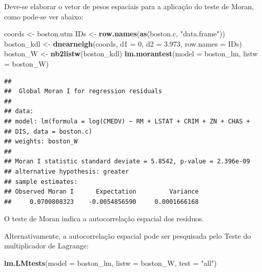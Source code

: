 \documentclass[12pt,]{article}
\newenvironment{Shaded}{\begin{snugshade}}{\end{snugshade}}
\newcommand{\KeywordTok}[1]{\textcolor[rgb]{0.13,0.29,0.53}{\textbf{#1}}}
\newcommand{\DataTypeTok}[1]{\textcolor[rgb]{0.13,0.29,0.53}{#1}}
\newcommand{\DecValTok}[1]{\textcolor[rgb]{0.00,0.00,0.81}{#1}}
\newcommand{\FloatTok}[1]{\textcolor[rgb]{0.00,0.00,0.81}{#1}}
\newcommand{\StringTok}[1]{\textcolor[rgb]{0.31,0.60,0.02}{#1}}
\newcommand{\NormalTok}[1]{#1}
\begin{document}
Deve-se elaborar o vetor de pesos espaciais para a aplicação do teste de
Moran, como pode-se ver abaixo:

\begin{Shaded}
\begin{Highlighting}[]
\NormalTok{coords <-}\StringTok{ }\NormalTok{boston.utm}
\NormalTok{IDs <-}\StringTok{ }\KeywordTok{row.names}\NormalTok{(}\KeywordTok{as}\NormalTok{(boston.c, }\StringTok{"data.frame"}\NormalTok{))}
\NormalTok{boston_kdl <-}\StringTok{ }\KeywordTok{dnearneigh}\NormalTok{(coords, }\DataTypeTok{d1 =} \DecValTok{0}\NormalTok{, }\DataTypeTok{d2 =} \FloatTok{3.973}\NormalTok{, }\DataTypeTok{row.names =}\NormalTok{ IDs)}
\NormalTok{boston_W <-}\StringTok{ }\KeywordTok{nb2listw}\NormalTok{(boston_kdl)}
\KeywordTok{lm.morantest}\NormalTok{(}\DataTypeTok{model =}\NormalTok{ boston_lm, }\DataTypeTok{listw =}\NormalTok{ boston_W)}
\end{Highlighting}
\end{Shaded}

\begin{verbatim}
## 
##  Global Moran I for regression residuals
## 
## data:  
## model: lm(formula = log(CMEDV) ~ RM + LSTAT + CRIM + ZN + CHAS +
## DIS, data = boston.c)
## weights: boston_W
## 
## Moran I statistic standard deviate = 5.8542, p-value = 2.396e-09
## alternative hypothesis: greater
## sample estimates:
## Observed Moran I      Expectation         Variance 
##     0.0700808323    -0.0054856590     0.0001666168
\end{verbatim}

O teste de Moran indica a autocorrelação espacial dos resíduos.

Alternativamente, a autocorrelação espacial pode ser pesquisada pelo
Teste do multiplicador de Lagrange:

\begin{Shaded}
\begin{Highlighting}[]
\KeywordTok{lm.LMtests}\NormalTok{(}\DataTypeTok{model =}\NormalTok{ boston_lm, }\DataTypeTok{listw =}\NormalTok{ boston_W, }\DataTypeTok{test =} \StringTok{"all"}\NormalTok{)}
\end{Highlighting}
\end{Shaded}
\end{document}

